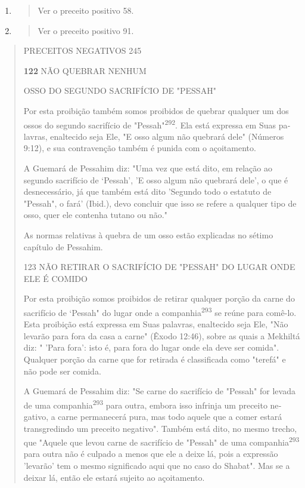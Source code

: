 \begin{enumerate}
\def\labelenumi{\arabic{enumi}.}
\setcounter{enumi}{289}
\item
  \begin{quote}
  Ver o preceito positivo 58.
  \end{quote}
\item
  \begin{quote}
  Ver o preceito positivo 91.
  \end{quote}
\end{enumerate}

\begin{quote}
PRECEITOS NEGATIVOS 245

\textbf{122} NÃO QUEBRAR NENHUM

OSSO DO SEGUNDO SACRIFÍCIO DE "PESSAH"

Por esta proibição também somos proibidos de quebrar qualquer um dos
ossos do segundo sacrifício de "Pessah"\textsuperscript{292}. Ela está
expressa em Suas pa­lavras, enaltecido seja Ele, "E osso algum não
quebrará dele" (Números 9:12), e sua contravenção também é punida com o
açoitamento.

A Guemará de Pessahim diz: "Uma vez que está dito, em relação ao segundo
sacrifício de `Pessah', 'E osso algum não quebrará dele', o que é
des­necessário, já que também está dito 'Segundo todo o estatuto de
"Pessah", o fará' (Ibid.), devo concluir que isso se refere a qualquer
tipo de osso, quer ele contenha tutano ou não."

As normas relativas à quebra de um osso estão explicadas no sétimo
capítulo de Pessahim.

123 NÃO RETIRAR O SACRIFÍCIO DE "PESSAH" DO LUGAR ONDE ELE É COMIDO

Por esta proibição somos proibidos de retirar qualquer porção da car­ne
do sacrifício de `Pessah" do lugar onde a companhia\textsuperscript{293}
se reúne para comê-lo. Esta proibição está expressa em Suas palavras,
enaltecido seja Ele, "Não leva­rão para fora da casa a carne" (Êxodo
12:46), sobre as quais a Mekhiltá diz: " 'Pa­ra fora': isto é, para fora
do lugar onde ela deve ser comida". Qualquer porção da carne que for
retirada é classificada como "terefá" e não pode ser comida.

A Guemará de Pessahim diz: "Se carne do sacrifício de "Pessah" for
levada de uma companhia\textsuperscript{293} para outra, embora isso
infrinja um preceito ne­gativo, a carne permanecerá pura, mas todo
aquele que a comer estará trans­gredindo um preceito negativo". Também
está dito, no mesmo trecho, que "Aquele que levou carne de sacrifício de
"Pessah" de uma companhia\textsuperscript{293} para outra não é culpado
a menos que ele a deixe lá, pois a expressão 'levarão' tem o mesmo
significado aqui que no caso do Shabat". Mas se a deixar lá, então ele
estará sujeito ao açoitamento.
\end{quote}

